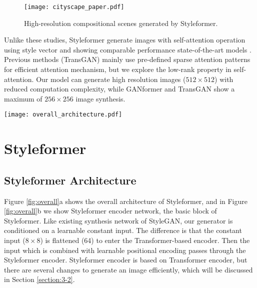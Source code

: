 \documentclass[10pt,twocolumn,letterpaper]{article}
\begin{document}
\begin{figure}[t]
\begin{center}

\texttt{[image: cityscape\_paper.pdf]}

\end{center}
\vspace{-5mm}
   \caption{High-resolution compositional scenes generated by Styleformer.
}
\label{fig:afhq}
\end{figure}

Unlike these studies, Styleformer generate images with self-attention operation using style vector and showing comparable performance state-of-the-art models \cite{karras2019stylebased,karras2020analyzing}. Previous methods (TransGAN) mainly use pre-defined sparse attention patterns for efficient attention mechanism, but we explore the low-rank property in self-attention. Our model can generate high resolution images ($512 \times 512$) with reduced computation complexity, while GANformer and TransGAN show a maximum of $256 \times 256$ image synthesis.



\begin{figure*}[t]
\begin{center}

\texttt{[image: overall\_architecture.pdf]}


\end{center}
\vspace{-5mm}
   \caption{(a) Overall Architecture of Styleformer. (b) Styleformer encoder structure, which is the basic block of Styleformer.
}
\vspace{-3mm}
\label{fig:overall}
\end{figure*}




\section{Styleformer}
\label{sec:3}







\subsection{Styleformer Architecture}
\label{section:3-1}

Figure \ref{fig:overall}a shows the overall architecture of Styleformer, and in Figure \ref{fig:overall}b we show Styleformer encoder network, the basic block of Styleformer. Like existing synthesis network of StyleGAN, our generator is conditioned on a learnable constant input. The difference is that the constant input ($8 \times 8$) is flattened (64) to enter the Transformer-based encoder. Then the input which is combined with learnable positional encoding passes through the Styleformer encoder. Styleformer encoder is based on Transformer encoder, but there are several changes to generate an image efficiently, which will be discussed in Section \ref{section:3-2}.  
\end{document}
